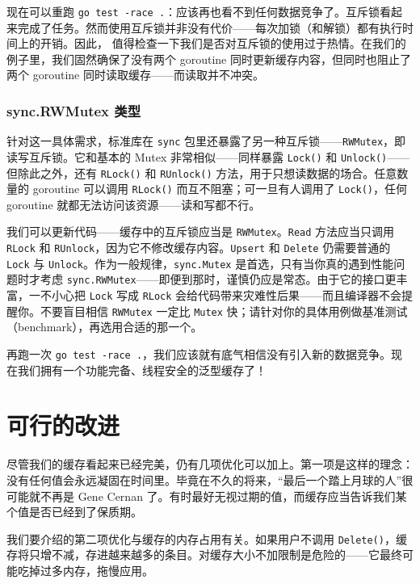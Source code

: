 现在可以重跑 \texttt{go test -race .}：应该再也看不到任何数据竞争了。互斥锁看起来完成了任务。然而使用互斥锁并非没有代价——每次加锁（和解锁）都有执行时间上的开销。因此，
值得检查一下我们是否对互斥锁的使用过于热情。在我们的例子里，我们固然确保了没有两个 goroutine 同时更新缓存内容，但同时也阻止了两个 goroutine 同时读取缓存——而读取并不冲突。

\subsubsection*{sync.RWMutex 类型}

针对这一具体需求，标准库在 \texttt{sync} 包里还暴露了另一种互斥锁——\texttt{RWMutex}，即读写互斥锁。它和基本的 Mutex 非常相似——同样暴露 \texttt{Lock()} 和 \texttt{Unlock()}——但除此之外，还有 \texttt{RLock()} 和 \texttt{RUnlock()} 方法，用于只想读数据的场合。任意数量的 goroutine 可以调用 \texttt{RLock()} 而互不阻塞；可一旦有人调用了 \texttt{Lock()}，任何 goroutine 就都无法访问该资源——读和写都不行。

我们可以更新代码——缓存中的互斥锁应当是 \texttt{RWMutex}。\texttt{Read} 方法应当只调用 \texttt{RLock} 和 \texttt{RUnlock}，因为它不修改缓存内容。\texttt{Upsert} 和 \texttt{Delete} 仍需要普通的 \texttt{Lock} 与 \texttt{Unlock}。作为一般规律，\texttt{sync.Mutex} 是首选，只有当你真的遇到性能问题时才考虑 \texttt{sync.RWMutex}——即便到那时，谨慎仍应是常态。由于它的接口更丰富，一不小心把 \texttt{Lock} 写成 \texttt{RLock} 会给代码带来灾难性后果——而且编译器不会提醒你。不要盲目相信 \texttt{RWMutex} 一定比 \texttt{Mutex} 快；请针对你的具体用例做基准测试（benchmark），再选用合适的那一个。

再跑一次 \texttt{go test -race .}，我们应该就有底气相信没有引入新的数据竞争。现在我们拥有一个功能完备、线程安全的泛型缓存了！

\section{可行的改进}

尽管我们的缓存看起来已经完美，仍有几项优化可以加上。第一项是这样的理念：没有任何值会永远凝固在时间里。毕竟在不久的将来，``最后一个踏上月球的人''很可能就不再是 Gene Cernan 了。有时最好无视过期的值，而缓存应当告诉我们某个值是否已经到了保质期。

我们要介绍的第二项优化与缓存的内存占用有关。如果用户不调用 \texttt{Delete()}，缓存将只增不减，存进越来越多的条目。对缓存大小不加限制是危险的——它最终可能吃掉过多内存，拖慢应用。

